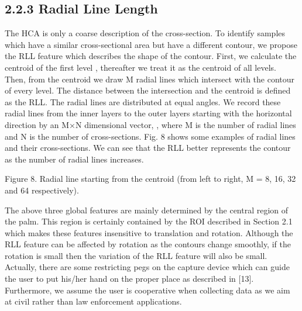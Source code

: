 \subsection{2.2.3   Radial Line Length}
\label{ssec:methodology:rll}

The HCA is only a coarse description of the cross-section. To identify samples which have a similar cross-sectional area but have a different contour, we propose the RLL feature which describes the shape of the contour. First, we calculate the centroid of the first level  , thereafter we treat it as the centroid of all levels. Then, from the centroid we draw M radial lines which intersect with the contour of every level. The distance between the intersection and the centroid is defined as the RLL. The radial lines are distributed at equal angles. We record these radial lines from the inner layers to the outer layers starting with the horizontal direction by an M×N dimensional vector,  , where M is the number of radial lines and N is the number of cross-sections. Fig. 8 shows some examples of radial lines and their cross-sections. We can see that the RLL better represents the contour as the number of radial lines increases.

Figure 8. Radial line starting from the centroid (from left to right, M = 8, 16, 32 and 64 respectively).

The above three global features are mainly determined by the central region of the palm. This region is certainly contained by the ROI described in Section 2.1 which makes these features insensitive to translation and rotation. Although the RLL feature can be affected by rotation as the contours change smoothly, if the rotation is small then the variation of the RLL feature will also be small. Actually, there are some restricting pegs on the capture device which can guide the user to put his/her hand on the proper place as described in [13]. Furthermore, we assume the user is cooperative when collecting data as we aim at civil rather than law enforcement applications.
